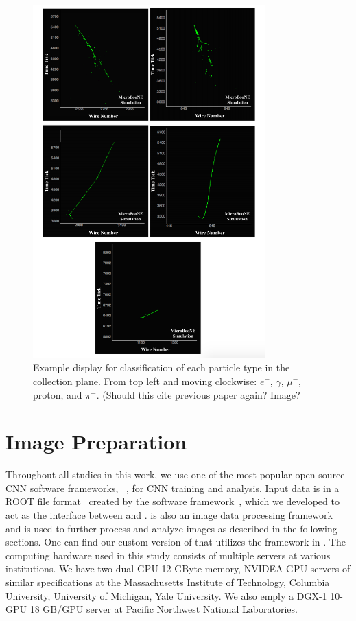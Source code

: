 \documentclass[11pt,a4paper]{article}
\begin{document}
\begin{figure}[t]
  \centering  
\includegraphics[width=0.8\textwidth]{Figures/five_part_types.png}

\caption{Example display for classification of each particle type in the collection plane.  From top left and moving clockwise: $e^-$, $\gamma$, $\mu^-$, proton, and $\pi^-$. (Should this cite previous paper again? Image?}
  \label{fig:fiveparts}
\end{figure}


\section{Image Preparation}

Throughout all studies in this work, we use one of the most popular open-source CNN software frameworks, {}~\cite{caffe}, for CNN training and analysis. Input data is in a ROOT file format~\cite{ROOT} created by the {} software framework~\cite{LArCV}, which we developed to act as the interface between {} and {}. {} is also an image data processing framework and is used to further process and analyze images as described in the following sections. One can find our custom version of {} that utilizes the {} framework in \cite{LArCV}.  
The computing hardware used in this study consists of multiple servers at various institutions. We have two dual-GPU 12 GByte memory, NVIDEA GPU servers of similar specifications at the Massachusetts Institute of Technology, Columbia University,  University of Michigan, Yale University. We also emply a DGX-1 10-GPU 18 GB/GPU server at Pacific Northwest National Laboratories.
\end{document}
